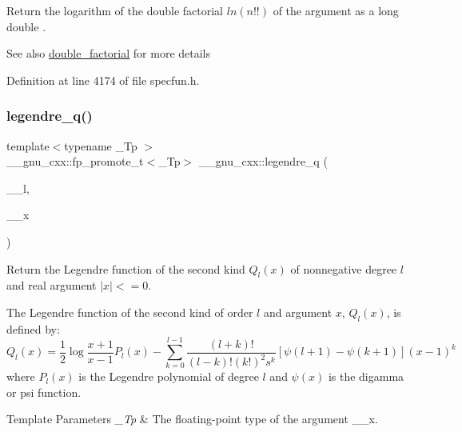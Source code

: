 Return the logarithm of the double factorial $ ln(n!!) $ of the argument as a {\ttfamily  long double }.

\begin{DoxySeeAlso}{See also}
\hyperlink{group__gnu__math__spec__func_ga1e62c47f84f9782828f8830b4fedc13c}{double\+\_\+factorial} for more details 
\end{DoxySeeAlso}


Definition at line 4174 of file specfun.\+h.

\mbox{\label{group__gnu__math__spec__func_gadad5b22d0075dca31690907668af568f}} 
\subsubsection{\texorpdfstring{legendre\+\_\+q()}{legendre\_q()}}
{\footnotesize\ttfamily template$<$typename \+\_\+\+Tp $>$ \\
\+\_\+\+\_\+gnu\+\_\+cxx\+::fp\+\_\+promote\+\_\+t$<$\+\_\+\+Tp$>$ \+\_\+\+\_\+gnu\+\_\+cxx\+::legendre\+\_\+q (\begin{DoxyParamCaption}\item[{unsigned int}]{\+\_\+\+\_\+l,  }\item[{\+\_\+\+Tp}]{\+\_\+\+\_\+x }\end{DoxyParamCaption})\hspace{0.3cm}{\ttfamily [inline]}}

Return the Legendre function of the second kind $ Q_l(x) $ of nonnegative degree $ l $ and real argument $ |x| <= 0 $.

The Legendre function of the second kind of order $ l $ and argument $ x $, $ Q_l(x) $, is defined by\+: \[ Q_l(x) = \frac{1}{2} \log{\frac{x+1}{x-1}} P_l(x) - \sum_{k=0}^{l-1}\frac{(l+k)!}{(l-k)!(k!)^2s^k} \left[\psi(l+1) - \psi(k+1)\right](x-1)^k \] where $ P_l(x) $ is the Legendre polynomial of degree $ l $ and $ \psi(x) $ is the digamma or psi function.


\begin{DoxyTemplParams}{Template Parameters}
{\em \+\_\+\+Tp} & The floating-\/point type of the argument {\ttfamily \+\_\+\+\_\+x}. \\
\hline
\end{DoxyTemplParams}

